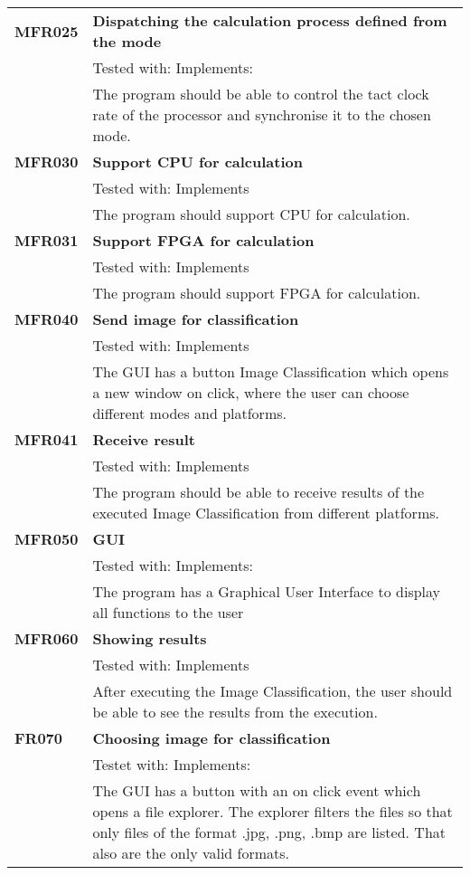 \documentclass[parskip=full]{scrartcl}
\begin{document}
\begin{tabular}{p{2cm}p{12cm}}
\textbf {MFR025} & \textbf{Dispatching the calculation process defined from the mode}\\
& Tested with: Implements: \\
& The program should be able to control the tact clock rate of the processor and synchronise it to the chosen mode. \\
\textbf {MFR030} & \textbf{Support CPU for calculation} \\
& Tested with: Implements \\
& The program should support CPU for calculation. \\
\textbf {MFR031} & \textbf{Support FPGA for calculation} \\
& Tested with: Implements \\
& The program should support FPGA for calculation. \\
\textbf {MFR040} & \textbf{Send image for classification} \\
& Tested with: Implements \\
& The GUI has a button Image Classification which opens a new window on click, where the user can choose different modes and platforms. \\
\textbf {MFR041} & \textbf{Receive result} \\
& Tested with: Implements \\
& The program should be able to receive results of the executed Image Classification from different platforms. \\
\textbf {MFR050} & \textbf{GUI} \\
& Tested with: Implements: \\
& The program has a Graphical User Interface to display all functions to the user \\
\textbf {MFR060} & \textbf{Showing results} \\
& Tested with: Implements\\
& After executing the Image Classification, the user should be able to see the results from the execution. \\
\textbf{FR070} & \textbf{Choosing image for classification}\\
& Testet with: Implements: \\
& The GUI has a button with an on click event which opens a file explorer. The explorer filters the files so that only files of the format .jpg, .png, .bmp are listed. That also are the only valid formats.\\

\end{tabular}
\end{document}
